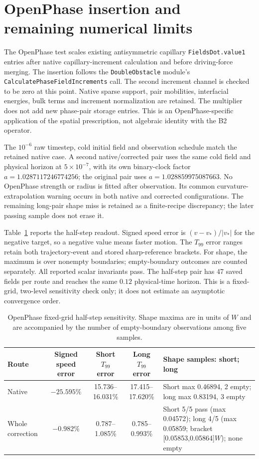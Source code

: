 \documentclass[a4paper,11pt]{article}
\begin{document}
\section{OpenPhase insertion and remaining numerical limits}
The OpenPhase test scales existing antisymmetric capillary \texttt{FieldsDot.value1} entries after native capillary-increment calculation and before driving-force merging. The insertion follows the \texttt{DoubleObstacle} module's \texttt{CalculatePhaseFieldIncrements} call. The second increment channel is checked to be zero at this point. Native sparse support, pair mobilities, interfacial energies, bulk terms and increment normalization are retained. The multiplier does not add new phase-pair storage entries. This is an OpenPhase-specific application of the spatial prescription, not algebraic identity with the B2 operator.

The $10^{-6}$ raw timestep, cold initial field and observation schedule match the retained native case. A second native/corrected pair uses the same cold field and physical horizon at $5\times10^{-7}$, with its own binary-clock factor $a=1.0287117246774256$; the original pair uses $a=1.028859975087663$. No OpenPhase strength or radius is fitted after observation. Its common curvature-extrapolation warning occurs in both native and corrected configurations. The remaining long-pair shape miss is retained as a finite-recipe discrepancy; the later passing sample does not erase it.

Table~\ref{tab:openphase-half} reports the half-step readout. Signed speed error is $(v-v_*)/|v_*|$ for the negative target, so a negative value means faster motion. The $T_{99}$ error ranges retain both trajectory-event and stored sharp-reference brackets. For shape, the maximum is over nonempty boundaries; empty-boundary outcomes are counted separately. All reported scalar invariants pass. The half-step pair has 47 saved fields per route and reaches the same $0.12$ physical-time horizon. This is a fixed-grid, two-level sensitivity check only; it does not estimate an asymptotic convergence order.

\begin{table}[htbp]
\caption{OpenPhase fixed-grid half-step sensitivity. Shape maxima are in units of $W$ and are accompanied by the number of empty-boundary observations among five samples.}
\label{tab:openphase-half}
\centering\scriptsize
\begin{tabularx}{\linewidth}{l c c c >{\raggedright\arraybackslash}X}
\toprule
Route & Signed speed error & Short $T_{99}$ error & Long $T_{99}$ error & Shape samples: short; long\\
\midrule
Native & $-25.595\%$ & 15.736--16.031\% & 17.415--17.620\% & Short max 0.46894, 2 empty; long max 0.83194, 3 empty\\
Whole correction & $-0.982\%$ & 0.787--1.085\% & 0.785--0.993\% & Short 5/5 pass (max 0.04572); long 4/5 (max 0.05859; bracket [0.05853,0.05864]$W$); none empty\\
\bottomrule
\end{tabularx}
\end{table}
\end{document}
